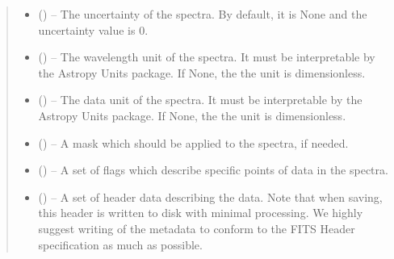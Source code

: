 \documentclass[letterpaper,11pt,english]{sphinxmanual}
\begin{document}
\begin{savenotes}
\begin{fulllineitems}
\begin{savenotes}
\begin{fulllineitems}
\begin{quote}
\begin{description}
\begin{itemize}
\item {} 
\sphinxAtStartPar
{} (\sphinxstyleliteralemphasis{\sphinxupquote{, }}) – The uncertainty of the spectra. By default, it is None and the
uncertainty value is 0.

\item {} 
\sphinxAtStartPar
{} (\sphinxstyleliteralemphasis{\sphinxupquote{, }}) – The wavelength unit of the spectra. It must be interpretable by
the Astropy Units package. If None, the the unit is dimensionless.

\item {} 
\sphinxAtStartPar
{} (\sphinxstyleliteralemphasis{\sphinxupquote{, }}) – The data unit of the spectra. It must be interpretable by
the Astropy Units package. If None, the the unit is dimensionless.

\item {} 
\sphinxAtStartPar
{} (\sphinxstyleliteralemphasis{\sphinxupquote{, }}) – A mask which should be applied to the spectra, if needed.

\item {} 
\sphinxAtStartPar
{} (\sphinxstyleliteralemphasis{\sphinxupquote{, }}) – A set of flags which describe specific points of data in the
spectra.

\item {} 
\sphinxAtStartPar
{} (\sphinxstyleliteralemphasis{\sphinxupquote{, }}) – A set of header data describing the data. Note that when saving,
this header is written to disk with minimal processing. We highly
suggest writing of the metadata to conform to the FITS Header
specification as much as possible.


\end{itemize}
\end{description}
\end{quote}
\end{fulllineitems}
\end{savenotes}
\end{fulllineitems}
\end{savenotes}
\end{document}
